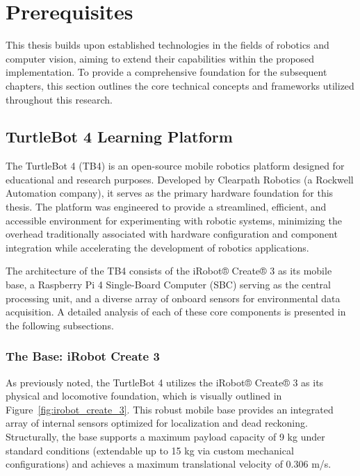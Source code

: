 \chapter{Prerequisites} %
This thesis builds upon established technologies in the fields of robotics and computer vision, aiming to extend their capabilities within the proposed implementation. To provide a comprehensive foundation for the subsequent chapters, this section outlines the core technical concepts and frameworks utilized throughout this research.

\section{TurtleBot 4 Learning Platform} %
The TurtleBot 4 (TB4) is an open-source mobile robotics platform designed for educational and research purposes. Developed by Clearpath Robotics \cite{clearpath2022tb4} (a Rockwell Automation company), it serves as the primary hardware foundation for this thesis. The platform was engineered to provide a streamlined, efficient, and accessible environment for experimenting with robotic systems, minimizing the overhead traditionally associated with hardware configuration and component integration while accelerating the development of robotics applications.

The architecture of the TB4 consists of the iRobot® Create® 3 as its mobile base, a Raspberry Pi 4 Single-Board Computer (SBC) serving as the central processing unit, and a diverse array of onboard sensors for environmental data acquisition. A detailed analysis of each of these core components is presented in the following subsections.

\subsection{The Base: iRobot Create 3}
As previously noted, the TurtleBot 4 utilizes the iRobot® Create® 3 \cite{irobot2022create3} as its physical and locomotive foundation, which is visually outlined in Figure~\ref{fig:irobot_create_3}. This robust mobile base provides an integrated array of internal sensors optimized for localization and dead reckoning. Structurally, the base supports a maximum payload capacity of 9 kg under standard conditions (extendable up to 15 kg via custom mechanical configurations) and achieves a maximum translational velocity of 0.306 m/s.

